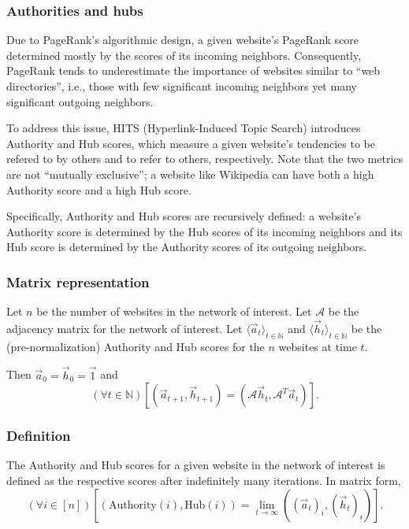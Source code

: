 \documentclass[12pt, titlepage, twoside]{amsart}
\newcommand{\N}{\ensuremath{\mathbb N}}
\begin{document}
\subsubsection{Authorities and hubs}

Due to PageRank's algorithmic design, a given website's PageRank score determined mostly by the scores of its
incoming neighbors.
Consequently, PageRank tends to underestimate the importance of websites similar to ``web directories'', i.e., those
with few significant incoming neighbors yet many significant outgoing neighbors.

To address this issue, HITS (Hyperlink-Induced Topic Search) introduces Authority and Hub scores, which measure
a given website's tendencies to be refered to by others and to refer to others, respectively.
Note that the two metrics are not ``mutually exclusive''; a website like Wikipedia can have both a high Authority score
and a high Hub score.

Specifically, Authority and Hub scores are recursively defined: a website's Authority score is determined by
the Hub scores of its incoming neighbors and its Hub score is determined by the Authority scores of its outgoing
neighbors.

\subsubsection{Matrix representation}

Let $n$ be the number of websites in the network of interest.
Let $\mathcal{A}$ be the adjacency matrix for the network of interest.
Let $\langle\vec{a}_t\rangle_{t\in\N}$ and $\langle\vec{h}_t\rangle_{t\in\N}$ be the (pre-normalization)
Authority and Hub scores for the $n$ websites at time $t$.

Then $\vec{a}_0 = \vec{h}_0 = \vec{1}$ and
\[
  (\forall t\in\N)
  \left[
    \left(\vec{a}_{t + 1}, \vec{h}_{t + 1}\right) = \left(\mathcal{A}\vec{h}_t, \mathcal{A}^T\vec{a}_t\right)
  \right].
\]

\subsubsection{Definition} The Authority and Hub scores for a given website in the network of interest is defined
as the respective scores after indefinitely many iterations.
In matrix form,
\[
  (\forall i\in[n])
  \left[
    \left(\mathrm{Authority}(i), \mathrm{Hub}(i)\right) =
    \lim_{t\to\infty}
    \left((\vec{a}_t)_i, (\vec{h}_t)_i\right)
  \right].
\]
\end{document}
